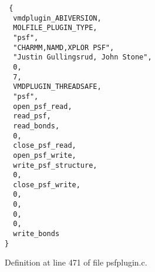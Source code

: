 \footnotesize\begin{verbatim} {
  vmdplugin_ABIVERSION,              
  MOLFILE_PLUGIN_TYPE,               
  "psf",                             
  "CHARMM,NAMD,XPLOR PSF",           
  "Justin Gullingsrud, John Stone",  
  0,                                 
  7,                                 
  VMDPLUGIN_THREADSAFE,              
  "psf",                             
  open_psf_read,                     
  read_psf,                          
  read_bonds,                        
  0,                                 
  close_psf_read,                    
  open_psf_write,                    
  write_psf_structure,               
  0,                                 
  close_psf_write,                   
  0,                                 
  0,                                 
  0,                                 
  0,                                 
  write_bonds                        
}\end{verbatim}\normalsize 


Definition at line 471 of file psfplugin.c.